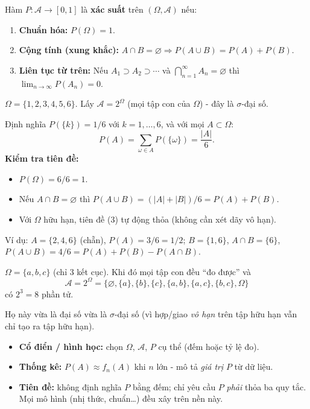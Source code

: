 \documentclass[12pt,a4paper]{article}
\begin{document}
\begin{dinhnghia}[title={Ba tiên đề Kolmogorov}]
Hàm $P \colon \mathcal{A} \to [0,1]$ là \textbf{xác suất} trên $(\Omega, \mathcal{A})$ nếu:
\begin{enumerate}
  \item \textbf{Chuẩn hóa:} $P(\Omega) = 1$.
  \item \textbf{Cộng tính (xung khắc):} $A \cap B = \varnothing \Rightarrow P(A \cup B) = P(A) + P(B)$.
  \item \textbf{Liên tục từ trên:} Nếu $A_1 \supset A_2 \supset \cdots$ và $\displaystyle\bigcap_{n=1}^{\infty} A_n = \varnothing$ thì $\displaystyle\lim_{n \to \infty} P(A_n) = 0$.
\end{enumerate}
\end{dinhnghia}

\begin{vidu}[title={Tung xúc sắc}]
$\Omega = \{1,2,3,4,5,6\}$. Lấy $\mathcal{A} = 2^{\Omega}$ (mọi tập con của $\Omega$) - đây là $\sigma$-đại số.

Định nghĩa $P(\{k\}) = 1/6$ với $k = 1,\ldots,6$, và với mọi $A \subset \Omega$:
\[
  P(A) = \sum_{\omega \in A} P(\{\omega\}) = \dfrac{|A|}{6}.
\]
\textbf{Kiểm tra tiên đề:}
\begin{itemize}
  \item $P(\Omega) = 6/6 = 1$.
  \item Nếu $A \cap B = \varnothing$ thì $P(A \cup B) = (|A|+|B|)/6 = P(A) + P(B)$.
  \item Với $\Omega$ hữu hạn, tiên đề (3) tự động thỏa (không cần xét dãy vô hạn).
\end{itemize}
Ví dụ: $A = \{2,4,6\}$ (chẵn), $P(A) = 3/6 = 1/2$; $B = \{1,6\}$, $A \cap B = \{6\}$, $P(A \cup B) = 4/6 = P(A) + P(B) - P(A \cap B)$.

$\Omega = \{a,b,c\}$ (chỉ 3 kết cục). Khi đó mọi tập con đều ``đo được'' và
\[
  \mathcal{A} = 2^{\Omega} = \{\varnothing, \{a\}, \{b\}, \{c\}, \{a,b\}, \{a,c\}, \{b,c\}, \Omega\}
\]
có $2^3 = 8$ phần tử.

Họ này vừa là đại số vừa là $\sigma$-đại số (vì hợp/giao \emph{vô hạn} trên tập hữu hạn vẫn chỉ tạo ra tập hữu hạn).
\end{vidu}

\begin{luuy}[title={Liên hệ ba quan điểm}]
\begin{itemize}
  \item \textbf{Cổ điển / hình học:} chọn $\Omega$, $\mathcal{A}$, $P$ cụ thể (đếm hoặc tỷ lệ đo).
  \item \textbf{Thống kê:} $P(A) \approx f_n(A)$ khi $n$ lớn - mô tả \emph{giá trị} $P$ từ dữ liệu.
  \item \textbf{Tiên đề:} không định nghĩa $P$ bằng đếm; chỉ yêu cầu $P$ \emph{phải} thỏa ba quy tắc. Mọi mô hình (nhị thức, chuẩn\ldots) đều xây trên nền này.
\end{itemize}
\end{luuy}
\end{document}

